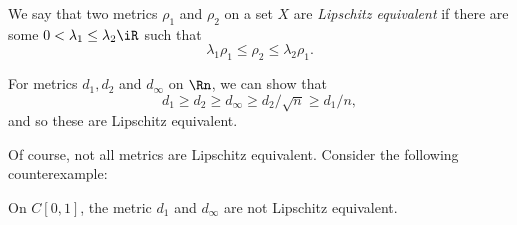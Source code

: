 
\begin{definition}
	We say that two metrics $\rho_1$ and $\rho_2$ on a set $X$ are \emph{Lipschitz equivalent} if there are some $0< \lambda_1 \leq \lambda_2 \iR$ such that
	\begin{equation*}
		\lambda_1 \rho_1 \leq \rho_2 \leq \lambda_2 \rho_1.
	\end{equation*}
\end{definition}

\begin{remark}
	For metrics $d_1, d_2$ and $d_\infty$ on $\Rn$, we can show that
	\begin{equation*}
		d_1 \geq d_2 \geq d_\infty \geq d_2/\sqrt{n} \geq d_1/n,
	\end{equation*}
	and so these are Lipschitz equivalent.
\end{remark}

Of course, not all metrics are Lipschitz equivalent. Consider the following counterexample:

\begin{proposition}
	On $C[0,1]$, the metric $d_1$ and $d_\infty$ are not Lipschitz equivalent.
	\label{prop:not-lip-equiv}
\end{proposition}

